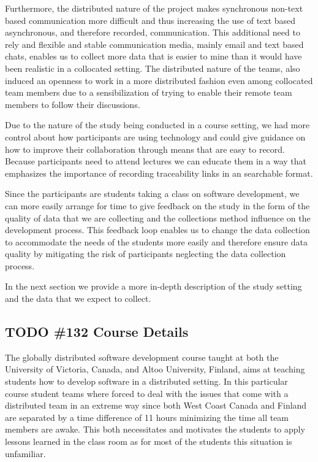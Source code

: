 Furthermore, the distributed nature of the project makes synchronous non-text based communication more difficult and thus increasing the use of text based asynchronous, and therefore recorded, communication.
This additional need to rely and flexible and stable communication media, mainly email and text based chats, enables us to collect more data that is easier to mine than it would have been realistic in a collocated setting.
The distributed nature of the teams, also induced an openness to work in a more distributed fashion even among collocated team members due to a sensibilization of trying to enable their remote team members to follow their discussions.

Due to the nature of the study being conducted in a course setting, we had more control about how participants are using technology and could give guidance on how to improve their collaboration through means that are easy to record.
Because participants need to attend lectures we can educate them in a way that emphasizes the importance of recording traceability links in an searchable format.

Since the participants are students taking a class on software development, we can more easily arrange for time to give feedback on the study in the form of the quality of data that we are collecting and the collections method influence on the development process.
This feedback loop enables us to change the data collection to accommodate the needs of the students more easily and therefore ensure data quality by mitigating the risk of participants neglecting the data collection process. 

In the next section we provide a more in-depth description of the study setting and the data that we expect to collect.

\subsection{TODO \#132 Course Details}
The globally distributed software development course taught at both the University of Victoria, Canada, and Altoo University, Finland, aims at teaching students how to develop software in a distributed setting.
In this particular course student teams where forced to deal with the issues that come with a distributed team in an extreme way since both West Coast Canada and Finland are separated by a time difference of 11 hours minimizing the time all team members are awake.
This both necessitates and motivates the students to apply lessons learned in the class room as for most of the students this situation is unfamiliar.

